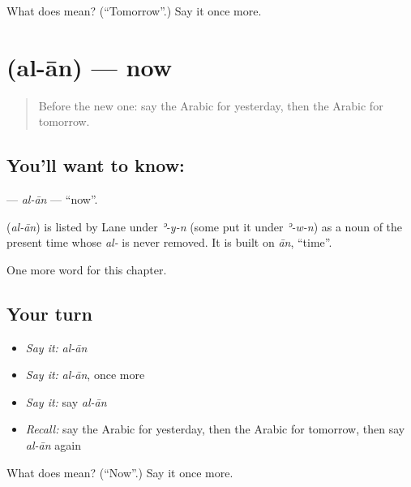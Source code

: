 \begin{tcolorbox}[breakable,colback=teal!4,colframe=teal!35!black,title={Before you move on}]
What does  mean? (\textquotedblleft{}Tomorrow\textquotedblright{}.) Say it once more.
\end{tcolorbox}
\section[\texorpdfstring{\ar{الآن} (al-ān)}{الآن (al-ān)}]{ (al-ān) — now}

\label{lesson:AR-C87-alan}



\begin{quote}
Before the new one: say the Arabic for yesterday, then the Arabic for tomorrow.
\end{quote}

\subsection*{You'll want to know: }
\textbf{} — \emph{al-ān} — \textquotedblleft{}now\textquotedblright{}.

\begin{cousinweb}
\textbf{} (\emph{al-ān}) is listed by Lane under \emph{ʾ-y-n} (some put it under \emph{ʾ-w-n}) as a noun of the present time whose \emph{al-} is never removed. It is built on \emph{ān}, \textquotedblleft{}time\textquotedblright{}.
\end{cousinweb}

\begin{grammarlens}[title={What you've built}]
One more word for this chapter.
\end{grammarlens}

\subsection*{Your turn}
\begin{itemize}
\raggedright
  \item \emph{Say it:} \emph{al-ān}
  \item \emph{Say it:} \emph{al-ān}, once more
  \item \emph{Say it:} say \emph{al-ān}
  \item \emph{Recall:} say the Arabic for yesterday, then the Arabic for tomorrow, then say \emph{al-ān} again
\end{itemize}

\begin{tcolorbox}[breakable,colback=teal!4,colframe=teal!35!black,title={Before you move on}]
What does  mean? (\textquotedblleft{}Now\textquotedblright{}.) Say it once more.
\end{tcolorbox}
